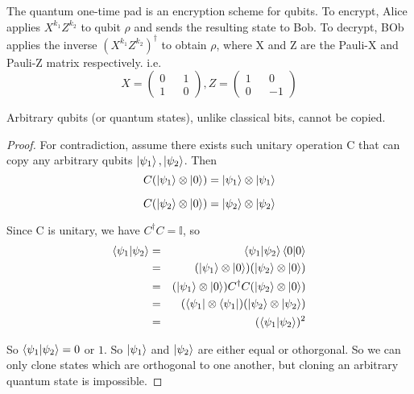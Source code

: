 \begin{definition}
The quantum one-time pad is an encryption scheme for qubits. To encrypt, Alice applies $X^{k_1} Z^{k_2}$ to qubit $\rho$ and sends the resulting state to Bob. To decrypt, BOb applies the inverse $(X^{k_1} Z^{k_2})^\dagger$ to obtain $\rho$, where X and Z are the Pauli-X and Pauli-Z matrix respectively. i.e.
\begin{equation}
    X=\begin{pmatrix}
    0 && 1\\
    1 && 0
    \end{pmatrix}, 
    Z=\begin{pmatrix}
    1 && 0\\
    0 && -1
    \end{pmatrix}
\end{equation}
\end{definition}

\begin{theorem} \label{no-cloning thm}
Arbitrary qubits (or quantum states), unlike classical bits, cannot be copied. 
\end{theorem} 

\begin{proof} \cite{Wehner:notes}
For contradiction, assume there exists such unitary operation C that can copy any arbitrary qubits $\ket{\psi_1}, \ket{\psi_2}$. Then
\begin{equation*}
    C(\ket{\psi_1} \otimes \ket{0})=\ket{\psi_1} \otimes \ket{\psi_1}
\end{equation*}

\begin{equation*}
C(\ket{\psi_2} \otimes \ket{0})=\ket{\psi_2} \otimes \ket{\psi_2}  
\end{equation*}
    

Since C is unitary, we have $C^\dagger C=\mathbb{I}$, so
\begin{eqnarray*}
\braket{\psi_1|\psi_2}&=&\braket{\psi_1|\psi_2}\braket{0|0}\\
&=&(\ket{\psi_1} \otimes \ket{0})(\ket{\psi_2} \otimes \ket{0})\\
&=&(\ket{\psi_1} \otimes \ket{0})C^\dagger C(\ket{\psi_2} \otimes \ket{0})\\
&=&(\bra{\psi_1} \otimes \bra{\psi_1})(\ket{\psi_2} \otimes \ket{\psi_2})\\
&=&(\braket{\psi_1 |\psi_2})^2
\end{eqnarray*}

So $\braket{\psi_1 | \psi_2}=0$ or $1$. So $\ket{\psi_1}$ and $\ket{\psi_2}$ are either equal or othorgonal. So we can only clone states which are orthogonal to one another, but cloning an arbitrary quantum state is impossible. 
\end{proof}

